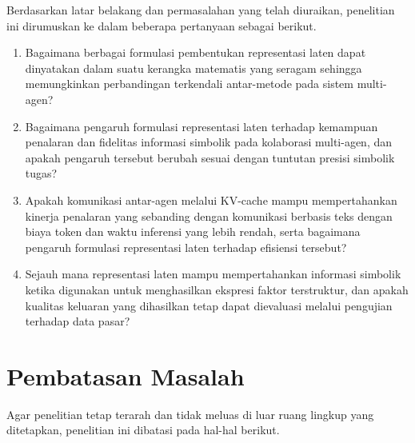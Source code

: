 Berdasarkan latar belakang dan permasalahan yang telah diuraikan, penelitian ini dirumuskan ke dalam beberapa pertanyaan sebagai berikut.

\begin{enumerate}

      \item Bagaimana berbagai formulasi pembentukan representasi laten dapat
            dinyatakan dalam suatu kerangka matematis yang seragam sehingga
            memungkinkan perbandingan terkendali antar-metode pada sistem
            multi-agen?

      \item Bagaimana pengaruh formulasi representasi laten terhadap kemampuan
            penalaran dan fidelitas informasi simbolik pada kolaborasi multi-agen,
            dan apakah pengaruh tersebut berubah sesuai dengan tuntutan presisi
            simbolik tugas?

      \item Apakah komunikasi antar-agen melalui KV-cache mampu mempertahankan
            kinerja penalaran yang sebanding dengan komunikasi berbasis teks
            dengan biaya token dan waktu inferensi yang lebih rendah, serta
            bagaimana pengaruh formulasi representasi laten terhadap efisiensi
            tersebut?

      \item Sejauh mana representasi laten mampu mempertahankan informasi
            simbolik ketika digunakan untuk menghasilkan ekspresi faktor
            terstruktur, dan apakah kualitas keluaran yang dihasilkan tetap dapat
            dievaluasi melalui pengujian terhadap data pasar?

\end{enumerate}


\section{Pembatasan Masalah}

Agar penelitian tetap terarah dan tidak meluas di luar ruang lingkup yang
ditetapkan, penelitian ini dibatasi pada hal-hal berikut.

